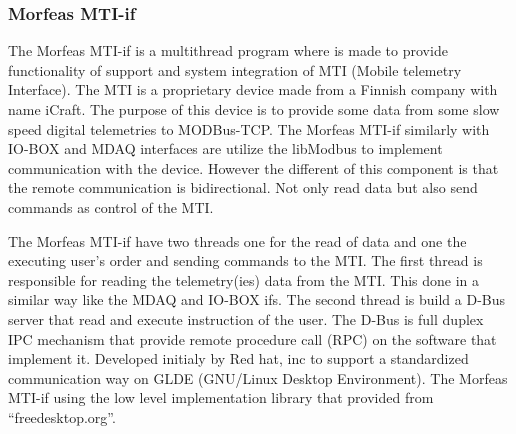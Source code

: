 \subsubsection{Morfeas MTI-if}
The Morfeas MTI-if is a multithread program where is made to provide functionality of support and system integration of MTI (Mobile telemetry Interface).
The MTI is a proprietary device made from a Finnish company with name iCraft. The purpose of this device is to provide some data from some slow speed digital telemetries
to MODBus-TCP. The Morfeas MTI-if similarly with IO-BOX and MDAQ interfaces are utilize the libModbus to implement communication with the device. However the different of this component
is that the remote communication is bidirectional. Not only read data but also send commands as control of the MTI.

The Morfeas MTI-if have two threads one for the read of data and one the executing user's order and sending commands to the MTI. The first thread is responsible for reading the telemetry(ies) data from the
MTI. This done in a similar way like the MDAQ and IO-BOX ifs. The second thread is build a D-Bus server that read and execute instruction of the user.
The D-Bus is full duplex IPC mechanism that provide remote procedure call (RPC) on the software that implement it. Developed initialy by Red hat, inc to support a standardized communication way
on GLDE (GNU/Linux Desktop Environment). The Morfeas MTI-if using the low level implementation library that provided from ``freedesktop.org''.\\

